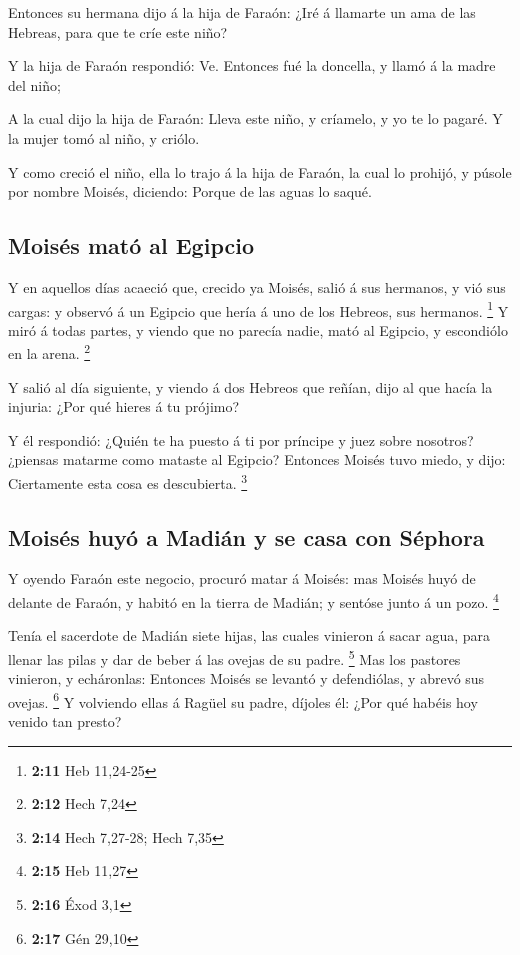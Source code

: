  Entonces su hermana dijo á la hija de Faraón: ¿Iré á
llamarte un ama de las Hebreas, para que te críe este niño?

 Y la hija de Faraón respondió: Ve. Entonces fué la
doncella, y llamó á la madre del niño;

 A la cual dijo la hija de Faraón: Lleva este niño, y
críamelo, y yo te lo pagaré. Y la mujer tomó al niño, y criólo.

 Y como creció el niño, ella lo trajo á la hija de
Faraón, la cual lo prohijó, y púsole por nombre Moisés, diciendo: Porque
de las aguas lo saqué.

\hypertarget{moisuxe9s-matuxf3-al-egipcio}{%
\subsection{Moisés mató al Egipcio}\label{moisuxe9s-matuxf3-al-egipcio}}

 Y en aquellos días acaeció que, crecido ya Moisés, salió
á sus hermanos, y vió sus cargas: y observó á un Egipcio que hería á uno
de los Hebreos, sus hermanos. \footnote{\textbf{2:11} Heb 11,24-25}
 Y miró á todas partes, y viendo que no parecía nadie,
mató al Egipcio, y escondiólo en la arena. \footnote{\textbf{2:12} Hech
  7,24}

 Y salió al día siguiente, y viendo á dos Hebreos que
reñían, dijo al que hacía la injuria: ¿Por qué hieres á tu prójimo?

 Y él respondió: ¿Quién te ha puesto á ti por príncipe y
juez sobre nosotros? ¿piensas matarme como mataste al Egipcio? Entonces
Moisés tuvo miedo, y dijo: Ciertamente esta cosa es descubierta.
\footnote{\textbf{2:14} Hech 7,27-28; Hech 7,35}

\hypertarget{moisuxe9s-huyuxf3-a-madiuxe1n-y-se-casa-con-suxe9phora}{%
\subsection{Moisés huyó a Madián y se casa con
Séphora}\label{moisuxe9s-huyuxf3-a-madiuxe1n-y-se-casa-con-suxe9phora}}

 Y oyendo Faraón este negocio, procuró matar á Moisés:
mas Moisés huyó de delante de Faraón, y habitó en la tierra de Madián; y
sentóse junto á un pozo. \footnote{\textbf{2:15} Heb 11,27}

 Tenía el sacerdote de Madián siete hijas, las cuales
vinieron á sacar agua, para llenar las pilas y dar de beber á las ovejas
de su padre. \footnote{\textbf{2:16} Éxod 3,1}  Mas los
pastores vinieron, y echáronlas: Entonces Moisés se levantó y
defendiólas, y abrevó sus ovejas. \footnote{\textbf{2:17} Gén 29,10}
 Y volviendo ellas á Ragüel su padre, díjoles él: ¿Por
qué habéis hoy venido tan presto?

